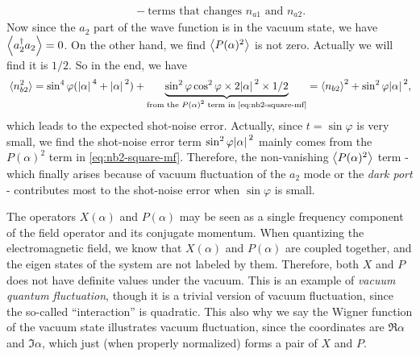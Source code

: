 \documentclass[hyperref, a4paper]{article}
\begin{document}
\begin{itemize}
\begin{equation}
\begin{aligned}
            &\quad - \text{terms that changes $n_{a1}$ and $n_{a2}$}.
        \end{aligned}
        \label{eq:nb2-square-mf}
    \end{equation}
    Now since the $a_2$ part of the wave function is in the vacuum state, we have $\expval{a_2^\dagger a_2} = 0$.
    On the other hand, we find $\expval{P(\alpha)^2}$ is not zero. Actually we will find it is $1/2$.
    So in the end, we have 
    \begin{equation}
        \expval*{n_{b2}^2} = \sin^4 \varphi (\abs*{\alpha}^4 + \abs*{\alpha}^2) + 
        \underbrace{\sin^2 \varphi \cos^2 \varphi \times 2 \abs*{\alpha}^2 \times 1/2}_{\text{from the $P(\alpha)^2$ term in \eqref{eq:nb2-square-mf}}} = \expval{n_{b2}}^2 + \sin^2 \varphi \abs*{\alpha}^2,
        \label{eq:shot-noise-decomposition}
    \end{equation}
    which leads to the expected shot-noise error. Actually, since $t = \sin \varphi$ is very small, we find the 
    shot-noise error term $\sin^2 \varphi \abs*{\alpha}^2$ mainly comes from the $P(\alpha)^2$ term in 
    \eqref{eq:nb2-square-mf}. Therefore, the non-vanishing $\expval{P(\alpha)^2}$ term - which finally arises
    because of vacuum fluctuation of the $a_2$ mode or the \emph{dark port} - contributes most to the 
    shot-noise error when $\sin \varphi$ is small.

    \begin{note*}{}
        The operators $X(\alpha)$ and $P(\alpha)$ may be seen as a single frequency component of the field operator
        and its conjugate momentum. When quantizing the electromagnetic field, we know that $X(\alpha)$ and 
        $P(\alpha)$ are coupled together, and the eigen states of the system are not labeled by them. Therefore,
        both $X$ and $P$ does not have definite values under the vacuum. This is an example of \emph{vacuum quantum
        fluctuation}, though it is a trivial version of vacuum fluctuation, since the so-called ``interaction'' is
        quadratic. This also why we say the Wigner function of the vacuum state illustrates vacuum fluctuation, 
        since the coordinates are $\Re \alpha$ and $\Im \alpha$, which just (when properly normalized) forms a 
        pair of $X$ and $P$.
    \end{note*}


\end{itemize}
\end{document}
